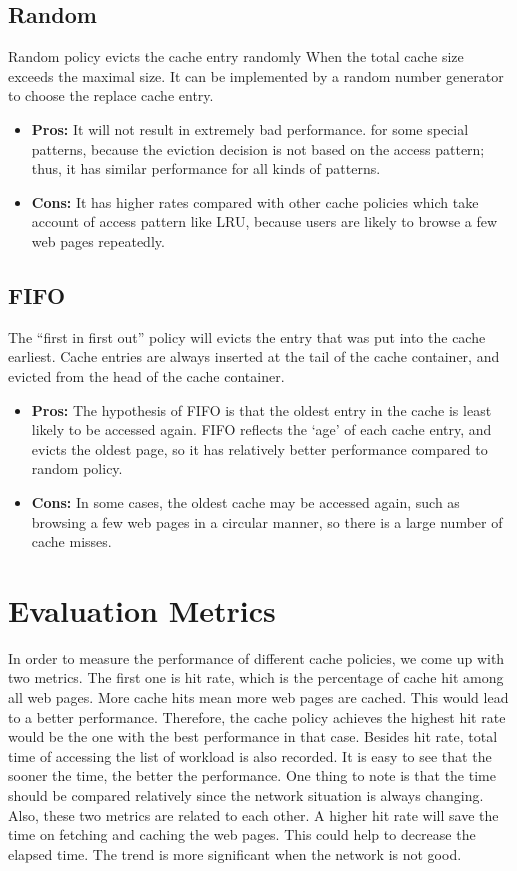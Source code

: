 \documentclass[paper=a4, fontsize=11pt]{scrartcl} %
\numberwithin{equation}{section} %
\numberwithin{figure}{section} %
\numberwithin{table}{section} %
\begin{document}
\subsection{Random}
Random policy evicts the cache entry randomly When the total cache 
size exceeds the maximal size. It can be implemented by a random
number generator to choose the replace cache entry.
\begin{itemize}
\item \textbf{Pros:} It will not result in extremely bad performance.
for some special
 patterns, because the eviction decision is not based on the 
access pattern; thus, it has similar performance for all kinds of patterns.
\item \textbf{Cons:} It has higher rates compared with other cache 
policies which take account of access pattern like LRU, because users
are likely to browse a few web pages repeatedly.
\end{itemize}

\subsection{FIFO}
The ``first in first out'' policy will evicts the entry that was put 
into the cache earliest. Cache entries are always inserted at the tail
of the cache container, and evicted from the head of the cache container.
\begin{itemize}
\item \textbf{Pros:} The hypothesis of FIFO is that the oldest entry in the cache is least
likely to be accessed again. FIFO reflects the `age' of each cache entry, 
and evicts the oldest page, so it has relatively better performance compared
to random policy.
\item \textbf{Cons:} In some cases, the oldest cache may be accessed again,
such as browsing a few web pages in a circular manner, so there is a large 
number of cache misses. 
\end{itemize}

\section{Evaluation Metrics}

In order to measure the performance of different cache policies, we come up with two metrics. The first one is hit rate, which is the percentage of cache hit among all web pages. More cache hits mean more web pages are cached. This would lead to a better performance. Therefore, the cache policy achieves the highest hit rate would be the one with the best performance in that case. Besides hit rate, total time of accessing the list of workload is also recorded. It is easy to see that the sooner the time, the better the performance. One thing to note is that the time should be compared relatively since the network situation is always changing. Also, these two metrics are related to each other. A higher hit rate will save the time on fetching and caching the web pages. This could help to decrease the elapsed time. The trend is more significant when the network is not good. 
\end{document}
